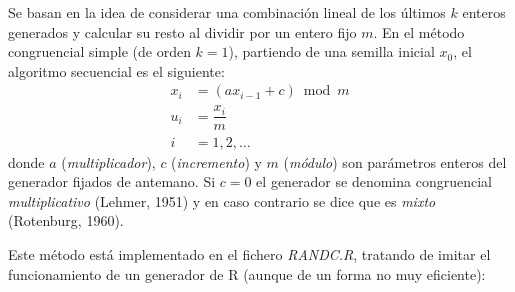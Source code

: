 \documentclass[
]{book}
\theoremstyle{break}
\theoremstyle{definition}
\theoremstyle{definition}
\theoremstyle{definition}
\theoremstyle{remark}
\begin{document}
Se basan en la idea de considerar una combinación lineal de los últimos \(k\) enteros generados y calcular su resto al dividir por un entero fijo \(m\).
En el método congruencial simple (de orden \(k = 1\)), partiendo de una semilla inicial \(x_0\), el algoritmo secuencial es el siguiente:
\[\begin{aligned}
x_{i}  & = (ax_{i-1}+c) \bmod m \\
u_{i}  & = \dfrac{x_{i}}{m} \\
i  & =1,2,\ldots
\end{aligned}\]
donde \(a\) (\emph{multiplicador}), \(c\) (\emph{incremento}) y \(m\) (\emph{módulo}) son parámetros enteros del generador fijados de antemano. Si \(c=0\) el generador se denomina congruencial \emph{multiplicativo} (Lehmer, 1951) y en caso contrario se dice que es \emph{mixto} (Rotenburg, 1960).

Este método está implementado en el fichero \emph{RANDC.R}, tratando de imitar el funcionamiento de un generador de R (aunque de un forma no muy eficiente):
\end{document}
